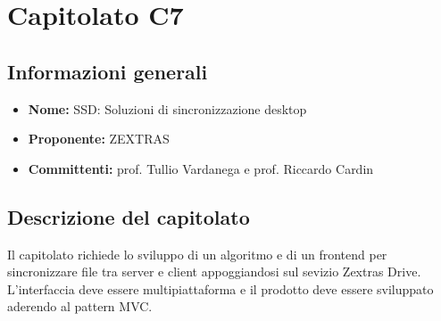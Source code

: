 \section{Capitolato C7}

\subsection{Informazioni generali}
\begin{itemize}
\item \textbf{Nome:} SSD: Soluzioni di sincronizzazione desktop
\item \textbf{Proponente:} ZEXTRAS
\item \textbf{Committenti:} prof. Tullio Vardanega e prof. Riccardo Cardin
\end{itemize}

\subsection{Descrizione del capitolato}
Il capitolato richiede lo sviluppo di un algoritmo e di un frontend per sincronizzare file tra server e client appoggiandosi sul sevizio Zextras Drive.
L'interfaccia deve essere multipiattaforma e il prodotto deve essere sviluppato aderendo al pattern MVC.

